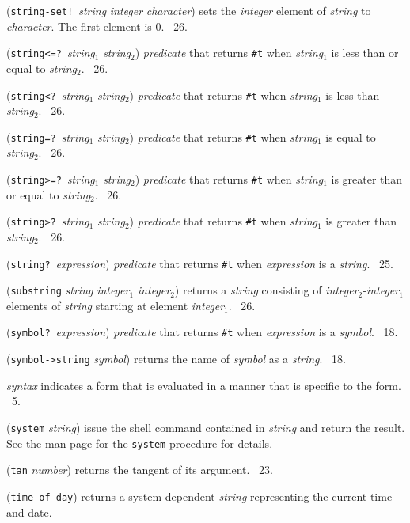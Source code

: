 \documentclass[10pt,twocolumn]{article}
\begin{document}
(\texttt{string-set!}\ \emph{string} \emph{integer} \emph{character})
sets the \emph{integer} element of \emph{string} to \emph{character}.
The first element is 0.  \RRRRRS~26.

(\texttt{string<=?}\ \emph{string}$_1$ \emph{string}$_2$)
\emph{predicate} that returns \texttt{\#t} when \emph{string}$_1$ is
less than or equal to \emph{string}$_2$.  \RRRRRS~26.

(\texttt{string<?}\ \emph{string}$_1$ \emph{string}$_2$)
\emph{predicate} that returns \texttt{\#t} when \emph{string}$_1$ is
less than \emph{string}$_2$.  \RRRRRS~26.

(\texttt{string=?}\ \emph{string}$_1$ \emph{string}$_2$)
\emph{predicate} that returns \texttt{\#t} when \emph{string}$_1$ is
equal to \emph{string}$_2$.  \RRRRRS~26.

(\texttt{string>=?}\ \emph{string}$_1$ \emph{string}$_2$)
\emph{predicate} that returns \texttt{\#t} when \emph{string}$_1$ is
greater than or equal to \emph{string}$_2$.  \RRRRRS~26.

(\texttt{string>?}\ \emph{string}$_1$ \emph{string}$_2$)
\emph{predicate} that returns \texttt{\#t} when \emph{string}$_1$ is
greater than \emph{string}$_2$.  \RRRRRS~26.

(\texttt{string?}\ \emph{expression}) \emph{predicate} that returns
\texttt{\#t} when \emph{expression} is a \emph{string}.  \RRRRRS~25.

(\texttt{substring} \emph{string} \emph{integer}$_1$
\emph{integer}$_2$) returns a \emph{string} consisting of
\emph{integer}$_2$-\emph{integer}$_1$ elements of \emph{string}
starting at element \emph{integer}$_1$.  \RRRRRS~26.

(\texttt{symbol?}\ \emph{expression}) \emph{predicate} that returns
\texttt{\#t} when \emph{expression} is a \emph{symbol}.  \RRRRRS~18.

(\texttt{symbol->string} \emph{symbol}) returns the name of
\emph{symbol} as a \emph{string}.  \RRRRRS~18.

\emph{syntax} indicates a form that is evaluated in a manner that is
specific to the form.  \RRRRRS~5.

(\texttt{system} \emph{string}) issue the shell command contained in
\emph{string} and return the result.  See the man page for the
\texttt{system} procedure for details.

(\texttt{tan} \emph{number}) returns the tangent of its argument.
\RRRRRS~23.

(\texttt{time-of-day}) returns a system dependent \emph{string}
representing the current time and date.
\end{document}
